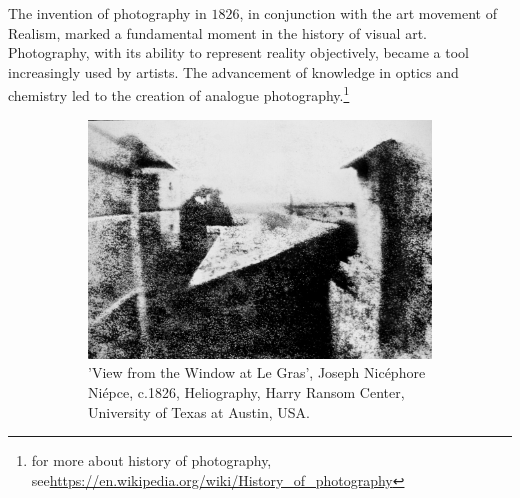 \begin{toReview}
\noindent The invention of photography in $1826$, in conjunction with the art movement of Realism, marked a fundamental moment in the history of visual art. Photography, with its ability to represent reality objectively, became a tool increasingly used by artists. The advancement of knowledge in optics and chemistry led to the creation of analogue photography.\footnote{for more about history of photography, see\newline\url{https://en.wikipedia.org/wiki/History_of_photography}}
\begin{figure}[ht]
    \centering
    \begin{subfigure}[t]{0.4\linewidth}
        \includegraphics[width=\linewidth]{Figures/FotoStoria.jpg}
        \caption{'View from the Window at Le Gras', Joseph Nicéphore Niépce, c.1826, Heliography, Harry Ransom Center, University of Texas at Austin, USA\cite{FirstPhoto}.}
    \end{subfigure}
    \hspace{2cm}
    \begin{subfigure}[t]{0.4\linewidth}

\end{subfigure}
\end{figure}
\end{toReview}
